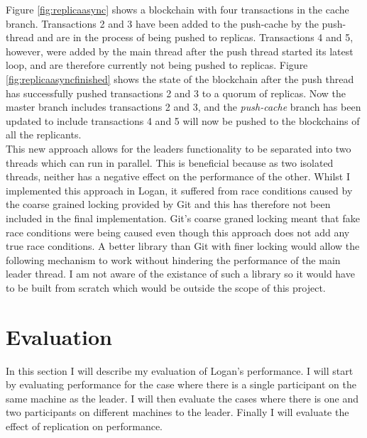 \documentclass[12pt,a4paper,twoside,openright]{report}
\begin{document}
	Figure \ref{fig:replicaasync} shows a blockchain with four transactions in the cache branch.
	Transactions 2 and 3 have been added to the push-cache by the push-thread and are in the process of being pushed to replicas. 
	Transactions 4 and 5, however, were added by the main thread after the push thread started its latest loop, and are therefore currently not being pushed to replicas.
	Figure \ref{fig:replicaasyncfinished} shows the state of the blockchain after the push thread has successfully pushed transactions 2 and 3 to a quorum of replicas.
	Now the master branch includes transactions 2 and 3, and the \textit{push-cache} branch has been updated to include transactions 4 and 5 will now be pushed to the blockchains of all the replicants.\\

	This new approach allows for the leaders functionality to be separated into two threads which can run in parallel. 
	This is beneficial because as two isolated threads, neither has a negative effect on the performance of the other.
	Whilst I implemented this approach in Logan, it suffered from race conditions caused by the coarse grained locking provided by Git and this has therefore not been included in the final implementation.
	Git's coarse graned locking meant that fake race conditions were being caused even though this approach does not add any true race conditions.
	A better library than Git with finer locking would allow the following mechanism to work without hindering the performance of the main leader thread.
	I am not aware of the existance of such a library so it would have to be built from scratch which would be outside the scope of this project.

	\chapter{Evaluation}
	In this section I will describe my evaluation of Logan's performance.
	I will start by evaluating performance for the case where there is a single participant on the same machine as the leader. 
	I will then evaluate the cases where there is one and two participants on different machines to the leader.
	Finally I will evaluate the effect of replication on performance.\\
\end{document}
